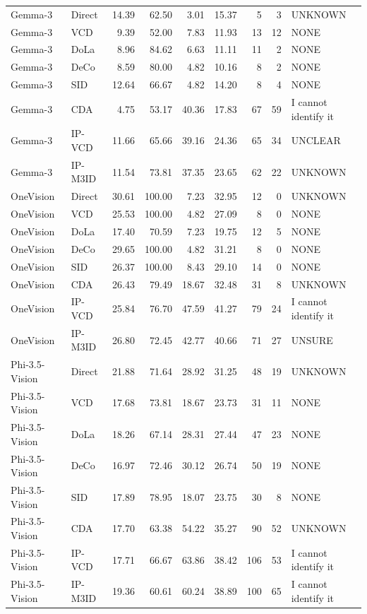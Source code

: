 \begin{longtable}{llrrrrrrl}
Gemma-3 & Direct & 14.39 & 62.50 & 3.01 & 15.37 & 5 & 3 & UNKNOWN\\
Gemma-3 & VCD & 9.39 & 52.00 & 7.83 & 11.93 & 13 & 12 & NONE\\
Gemma-3 & DoLa & 8.96 & 84.62 & 6.63 & 11.11 & 11 & 2 & NONE\\
Gemma-3 & DeCo & 8.59 & 80.00 & 4.82 & 10.16 & 8 & 2 & NONE\\
Gemma-3 & SID & 12.64 & 66.67 & 4.82 & 14.20 & 8 & 4 & NONE\\
Gemma-3 & CDA & 4.75 & 53.17 & 40.36 & 17.83 & 67 & 59 & I cannot identify it\\
Gemma-3 & IP-VCD & 11.66 & 65.66 & 39.16 & 24.36 & 65 & 34 & UNCLEAR\\
Gemma-3 & IP-M3ID & 11.54 & 73.81 & 37.35 & 23.65 & 62 & 22 & UNKNOWN\\
OneVision & Direct & 30.61 & 100.00 & 7.23 & 32.95 & 12 & 0 & UNKNOWN\\
OneVision & VCD & 25.53 & 100.00 & 4.82 & 27.09 & 8 & 0 & NONE\\
OneVision & DoLa & 17.40 & 70.59 & 7.23 & 19.75 & 12 & 5 & NONE\\
OneVision & DeCo & 29.65 & 100.00 & 4.82 & 31.21 & 8 & 0 & NONE\\
OneVision & SID & 26.37 & 100.00 & 8.43 & 29.10 & 14 & 0 & NONE\\
OneVision & CDA & 26.43 & 79.49 & 18.67 & 32.48 & 31 & 8 & UNKNOWN\\
OneVision & IP-VCD & 25.84 & 76.70 & 47.59 & 41.27 & 79 & 24 & I cannot identify it\\
OneVision & IP-M3ID & 26.80 & 72.45 & 42.77 & 40.66 & 71 & 27 & UNSURE\\
Phi-3.5-Vision & Direct & 21.88 & 71.64 & 28.92 & 31.25 & 48 & 19 & UNKNOWN\\
Phi-3.5-Vision & VCD & 17.68 & 73.81 & 18.67 & 23.73 & 31 & 11 & NONE\\
Phi-3.5-Vision & DoLa & 18.26 & 67.14 & 28.31 & 27.44 & 47 & 23 & NONE\\
Phi-3.5-Vision & DeCo & 16.97 & 72.46 & 30.12 & 26.74 & 50 & 19 & NONE\\
Phi-3.5-Vision & SID & 17.89 & 78.95 & 18.07 & 23.75 & 30 & 8 & NONE\\
Phi-3.5-Vision & CDA & 17.70 & 63.38 & 54.22 & 35.27 & 90 & 52 & UNKNOWN\\
Phi-3.5-Vision & IP-VCD & 17.71 & 66.67 & 63.86 & 38.42 & 106 & 53 & I cannot identify it\\
Phi-3.5-Vision & IP-M3ID & 19.36 & 60.61 & 60.24 & 38.89 & 100 & 65 & I cannot identify it\\
\end{longtable}\endgroup

